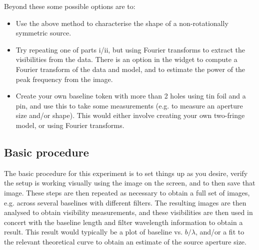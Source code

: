 \documentclass[11pt]{article}
\begin{document}
Beyond these some possible options are to:
\begin{itemize}
    \item Use the above method to characterise the shape of a non-rotationally symmetric source.
    \item Try repeating one of parts i/ii, but using Fourier transforms to extract the visibilities from the data. There is an option in the widget to compute a Fourier transform of the data and model, and to estimate the power of the peak frequency from the image.
    \item Create your own baseline token with more than 2 holes using tin foil and a pin, and use this to take some measurements (e.g. to measure an aperture size and/or shape). This would either involve creating your own two-fringe model, or using Fourier transforms.
\end{itemize}

\subsection{Basic procedure}

The basic procedure for this experiment is to set things up as you desire, verify the setup is working visually using the image on the screen, and to then save that image. These steps are then repeated as necessary to obtain a full set of images, e.g. across several baselines with different filters. The resulting images are then analysed to obtain visibility measurements, and these visibilities are then used in concert with the baseline length and filter wavelength information to obtain a result. This result would typically be a plot of baseline vs. $b/\lambda$, and/or a fit to the relevant theoretical curve to obtain an estimate of the source aperture size.

\clearpage


\end{document}
